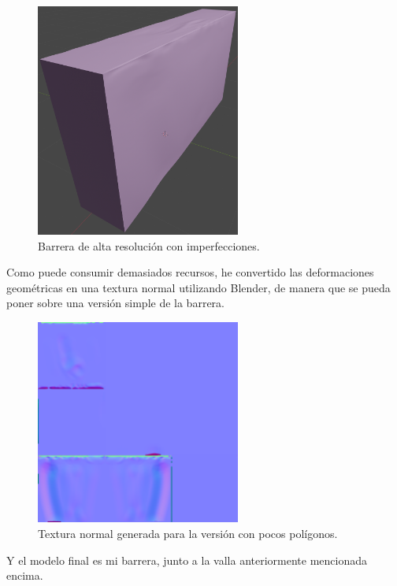 \begin{figure}[H]
    \centering
    \includegraphics[width=0.6\textwidth]{imagenes/barrier/barrierHP.png}
    \caption{Barrera de alta resolución con imperfecciones.}
    \label{fig:barreraHP}
\end{figure}

Como puede consumir demasiados recursos, he convertido las deformaciones geométricas en una textura normal utilizando Blender, de manera que se pueda poner sobre una versión simple de la barrera.

\begin{figure}[H]
    \centering
    \includegraphics[width=0.6\textwidth]{imagenes/barrier/barrierNormal.png}
    \caption{Textura normal generada para la versión con pocos polígonos.}
    \label{fig:barreraLP}
\end{figure}


Y el modelo final es mi barrera, junto a la valla anteriormente mencionada encima.

